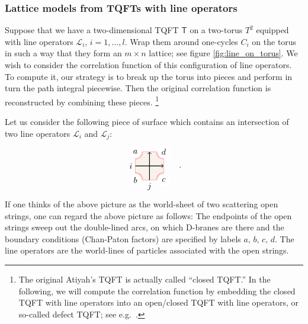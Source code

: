 \subsubsection{Lattice models from TQFTs with line operators}

Suppose that we have a two-dimensional TQFT $\mathsf{T}$ on a two-torus
$T^{2}$ equipped with line operators $\mathcal{L}_{i}$, $i=1,\ldots,l$.
Wrap them around one-cycles $C_{i}$ on the torus in such a way that
they form an $m\times n$ lattice; see figure \ref{fig:line_on_torus}. We wish to consider the correlation
function of this configuration of line operators. To compute it, our
strategy is to break up the torus into pieces and perform in turn
the path integral piecewise. Then the original correlation function
is reconstructed by combining these pieces.%
%
\footnote{The original Atiyah's TQFT is actually called ``closed TQFT.''
In the following, we will compute the correlation function by embedding
the closed TQFT with line operators into an open/closed TQFT with
line operators, or so-called defect TQFT; see e.g.~\cite{Moore:2006dw,Carqueville:2016nqk}. }
%

Let us consider the following piece of surface which contains an intersection
of two line operators $\mathcal{L}_{i}$ and $\mathcal{L}_{j}$:
\begin{equation}
  \label{eq:piece_of_lines}
    \begin{tikzpicture}[scale=0.6, baseline=(x.base)]
        \node (x) at (0,0) {\vphantom{x}};

        \draw[color=red!50, fill=brown!10] (-1,-1) rectangle (1,1);

        \fill[color=white] (-1,1) circle (0.5);  \node (a) at (-1,1) {$a$};
        \draw[draw=red!50, double]  (-1,0.5) arc (-90:0:0.5);
        \fill[color=white] (-1,-1) circle (0.5);  \node (b) at (-1,-1) {$b$};
        \draw[draw=red!50, double]  (-1,-0.5) arc (90:0:0.5);
        \fill[color=white] (1,-1) circle (0.5);  \node (c) at (1,-1) {$c$};
        \draw[draw=red!50, double]  (1,-0.5) arc (90:180:0.5);
        \fill[color=white] (1,1) circle (0.5);  \node (d) at (1,1) {$d$};
        \draw[draw=red!50, double]  (1,0.5) arc (-90:-180:0.5);

        \draw[thick, ->] (-1,0) node[left] {$i$} -- (1,0);
        \draw[thick, ->] (0,-1) node[below] {$j$} -- (0,1);

    \end{tikzpicture}
  \quad .
\end{equation}
If one thinks of the above picture as the world-sheet of two scattering
open strings, one can regard the above picture as follows: The endpoints
of the open strings sweep out the double-lined arcs, on which D-branes
are there and the boundary conditions (Chan-Paton factors) are specified
by labels $a,\,b,\,c,\,d$. The line operators are the world-lines
of particles associated with the open strings.


